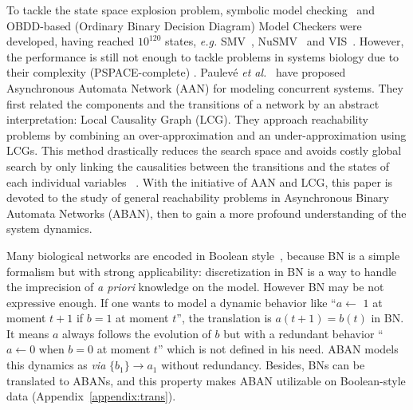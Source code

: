 \documentclass[runningheads]{llncs}
\newcommand{\ac}[3]{$\{#1\}\rightarrow#3$}
\begin{document}
To tackle the state space explosion problem, symbolic model checking~\cite{burch1992symbolic} and OBDD-based (Ordinary Binary Decision Diagram) Model Checkers were developed, having reached $10^{120}$ states, \textit{e.g.}
SMV~\cite{mcmillan1993symbolic}, NuSMV~\cite{cimatti2000nusmv} and VIS~\cite{brayton1996vis}.
However, the performance is still not enough to tackle problems in systems biology due to their complexity (PSPACE-complete) \cite{harel2002complexity}.
Paulev\'e \textit{et al.}~\cite{folschette2015,pauleve2011} have proposed Asynchronous Automata Network (AAN) for modeling concurrent systems.
They first related the components and the transitions of a network by an abstract interpretation: Local Causality Graph (LCG).
They approach reachability problems by combining an over-approximation and an under-approximation using LCGs.
This method drastically reduces the search space and avoids costly global search by only linking the causalities between the transitions and the states of each individual variables ~\cite{pauleve2012}.
With the initiative of AAN and LCG, this paper is devoted to the study of general reachability problems in Asynchronous Binary Automata Networks (ABAN), then to gain a more profound understanding of the system dynamics. 

Many biological networks are encoded in Boolean style~\cite{akutsu2007control,kauffman1969}, because BN is a simple formalism but with strong applicability: discretization in BN is a way to handle the imprecision of \textit{a priori} knowledge on the model.
However BN may be not expressive enough.
If one wants to model a dynamic behavior like ``$a\gets$ $1$ at moment $t+1$ if $b=1$ at moment $t$'', the translation is $a(t+1)=b(t)$ in BN.
It means $a$ always follows the evolution of $b$ but with a redundant behavior ``$a\gets 0$ when $b=0$ at moment $t$'' which is not defined in his need.
ABAN models this dynamics as \textit{via} \ac{b_1}{a_0}{a_1} without redundancy. 
Besides, BNs can be translated to ABANs, and this property makes ABAN utilizable on Boolean-style data (Appendix~\ref{appendix:trans}).
\end{document}
